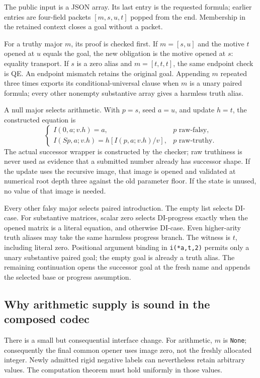 \documentclass[11pt,letterpaper]{article}
\theoremstyle{definition}\newtheorem{definition}[theorem]{Definition}
\theoremstyle{remark}\newtheorem{remark}[theorem]{Remark}
\begin{document}
The public input is a JSON array. Its last entry is the requested formula;
earlier entries are four-field packets $[m,s,u,t]$ popped from the end.
Membership in the retained context closes a goal without a packet.

For a truthy major $m$, its proof is checked first. If $m=[s,u]$ and
the motive $t$ opened at $u$ equals the goal, the new obligation is the
motive opened at $s$: equality transport. If $s$ is a zero alias and
$m=[t,t,t]$, the same endpoint check is QE. An endpoint mismatch retains
the original goal. Appending $m$ repeated three times exports its
conditional-universal clause when $m$ is a unary paired formula; every
other nonempty substantive array gives a harmless truth alias.

A null major selects arithmetic. With $p=s$, seed $a=u$, and update
$h=t$, the constructed equation is
\[
 \begin{cases}
 I(0,a;v.h)=a,&p\text{ raw-falsy},\\
 I(Sp,a;v.h)=h[I(p,a;v.h)/v],&p\text{ raw-truthy}.
 \end{cases}
\]
The actual successor wrapper is constructed by the checker; raw
truthiness is never used as evidence that a submitted number already
has successor shape. If the update uses the recursive image, that image
is opened and validated at numerical root depth three against the old
parameter floor. If the state is unused, no value of that image is
needed.

Every other falsy major selects paired introduction. The empty list
selects DI-case. For substantive matrices, scalar zero selects DI-progress
exactly when the opened matrix is a literal equation, and otherwise DI-case.
Even higher-arity truth aliases may take the same harmless progress branch.
The witness is
$t$, including literal zero. Positional argument binding in
\texttt{i(*a,t,2)} permits only a unary substantive paired goal; the
empty goal is already a truth alias. The remaining continuation opens
the successor goal at the fresh name and appends the selected base or
progress assumption.

\subsection{Why arithmetic supply is sound in the composed codec}

There is a small but consequential interface change. For arithmetic,
$m$ is \texttt{None}; consequently the final common opener uses image
zero, not the freshly allocated integer. Newly admitted rigid negative
labels can nevertheless retain arbitrary values. The computation theorem
must hold uniformly in those values.
\end{document}

